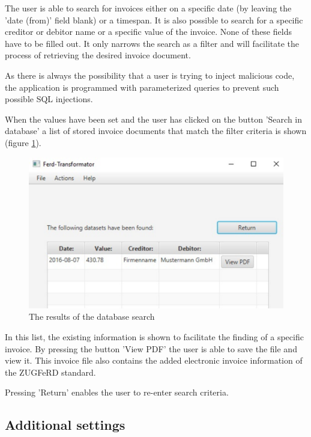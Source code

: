 The user is able to search for invoices either on a specific date (by leaving the 'date (from)' field blank) or a timespan.
It is also possible to search for a specific creditor or debitor name or a specific value of the invoice.
None of these fields have to be filled out. It only narrows the search as a filter and will facilitate the process of retrieving the desired invoice document.

As there is always the possibility that a user is trying to inject malicious code, the application is programmed with parameterized queries to prevent such possible SQL injections.

When the values have been set and the user has clicked on the button 'Search in database' a list of stored invoice documents that match the filter criteria is shown (figure \ref{searchResults}).

\begin{figure}[ht!]
\centering
\includegraphics[scale=0.6,natwidth=181,natheight=107]{Images/GUI/SearchResults.pdf}
\caption{The results of the database search \label{searchResults}}
\end{figure}

In this list, the existing information is shown to facilitate the finding of a specific invoice. By pressing the button 'View PDF' the user is able to save the file and view it. This invoice file also contains the added electronic invoice information of the ZUGFeRD standard.

Pressing 'Return' enables the user to re-enter search criteria. 

\subsection{Additional settings}
\label{sec5.8.3}

